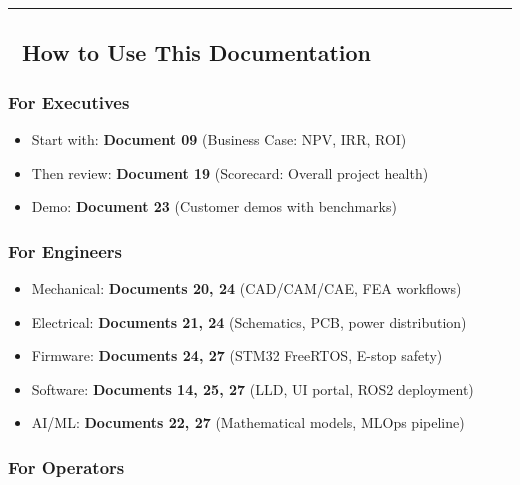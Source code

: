 \documentclass[
]{article}
\providecommand{\tightlist}{%
  \setlength{\itemsep}{0pt}\setlength{\parskip}{0pt}}
\begin{document}
\begin{center}\rule{0.5\linewidth}{0.5pt}\end{center}

\hypertarget{how-to-use-this-documentation}{%
\subsection{📖 How to Use This
Documentation}\label{how-to-use-this-documentation}}

\hypertarget{for-executives}{%
\subsubsection{For Executives}\label{for-executives}}

\begin{itemize}
\tightlist
\item
  Start with: \textbf{Document 09} (Business Case: NPV, IRR, ROI)
\item
  Then review: \textbf{Document 19} (Scorecard: Overall project health)
\item
  Demo: \textbf{Document 23} (Customer demos with benchmarks)
\end{itemize}

\hypertarget{for-engineers}{%
\subsubsection{For Engineers}\label{for-engineers}}

\begin{itemize}
\tightlist
\item
  Mechanical: \textbf{Documents 20, 24} (CAD/CAM/CAE, FEA workflows)
\item
  Electrical: \textbf{Documents 21, 24} (Schematics, PCB, power
  distribution)
\item
  Firmware: \textbf{Documents 24, 27} (STM32 FreeRTOS, E-stop safety)
\item
  Software: \textbf{Documents 14, 25, 27} (LLD, UI portal, ROS2
  deployment)
\item
  AI/ML: \textbf{Documents 22, 27} (Mathematical models, MLOps pipeline)
\end{itemize}

\hypertarget{for-operators}{%
\subsubsection{For Operators}\label{for-operators}}
\end{document}
